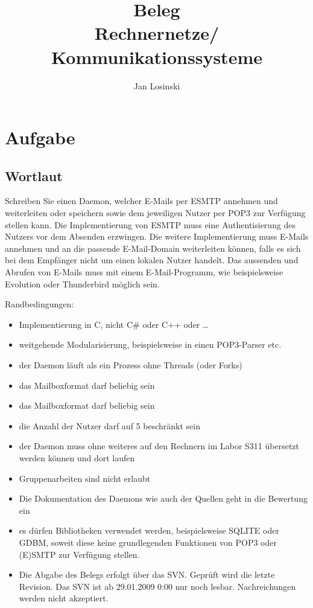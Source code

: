 \documentclass[final,a4paper,11pt,notitlepage,halfparskip]{scrreprt}
\title{Beleg\\
Rechnernetze/\\
Kommunikationssysteme}
\author{Jan Losinski}
\begin{document}
\maketitle

\tableofcontents

\chapter{Aufgabe}

\section{Wortlaut}
Schreiben Sie einen Daemon, welcher E-Mails per ESMTP annehmen und weiterleiten 
oder speichern sowie dem jeweiligen Nutzer per POP3 zur Verfügung stellen kann. 
Die Implementierung von ESMTP muss eine Authentisierung des Nutzers vor dem 
Absenden erzwingen. Die weitere Implementierung muss E-Mails annehmen und an die 
passende E-Mail-Domain weiterleiten können, falls es sich bei dem Empfänger 
nicht um einen lokalen Nutzer handelt. Das aussenden und Abrufen von E-Mails 
muss mit einem E-Mail-Programm, wie beispielsweise Evolution oder Thunderbird 
möglich sein.

Randbedingungen:
\begin{itemize}
  \item Implementierung in C, nicht C\# oder C++ oder \dots
  \item weitgehende Modularisierung, beispielsweise in einen POP3-Parser etc.
  \item der Daemon läuft als ein Prozess ohne Threads (oder Forks)
  \item das Mailboxformat darf beliebig sein
  \item das Mailboxformat darf beliebig sein
  \item die Anzahl der Nutzer darf auf 5 beschränkt sein
  \item der Daemon muss ohne weiteres auf den Rechnern im Labor S311 übersetzt 
        werden können und dort laufen
  \item Gruppenarbeiten sind nicht erlaubt
  \item Die Dokumentation des Daemons wie auch der Quellen geht in die Bewertung 
        ein
  \item es dürfen Bibliotheken verwendet werden, beispielsweise SQLITE oder 
        GDBM, soweit diese keine grundlegenden Funktionen von POP3 oder (E)SMTP 
	zur Verfügung stellen.
  \item Die Abgabe des Belegs erfolgt über das SVN. Geprüft wird die letzte 
        Revision. Das SVN ist ab 29.01.2009 0:00 nur noch lesbar. Nachreichungen 
	werden nicht akzeptiert.
\end{itemize}
\end{document}
